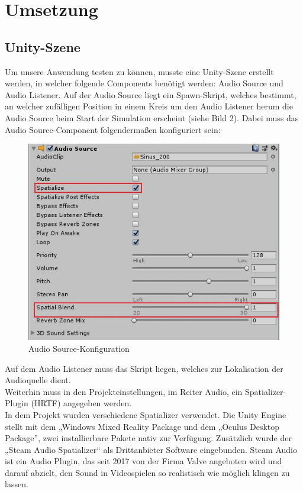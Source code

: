 \documentclass[12pt,a4paper]{article}
\begin{document}
\section{Umsetzung}
\subsection{Unity-Szene}
Um unsere Anwendung testen zu können, musste eine Unity-Szene erstellt werden, in welcher folgende Components benötigt werden: Audio Source und Audio Listener. Auf der Audio Source liegt ein Spawn-Skript, welches bestimmt, an welcher zufälligen Position in einem Kreis um den Audio Listener herum die Audio Source beim Start der Simulation erscheint (siehe Bild 2). Dabei muss das Audio Source-Component folgendermaßen konfiguriert sein:

\begin{figure}[h!]
\centering
\includegraphics[scale=0.6]{setup2}
\caption{Audio Source-Konfiguration}
\end{figure}

Auf dem Audio Listener muss das Skript liegen, welches zur Lokalisation der Audioquelle dient.\\
Weiterhin muss in den Projekteinstellungen, im Reiter Audio, ein Spatializer-Plugin (HRTF) angegeben werden.\\
In dem Projekt wurden verschiedene Spatializer verwendet. Die Unity Engine stellt mit dem „Windows Mixed Reality Package und dem „Oculus Desktop Package”, zwei installierbare Pakete nativ zur Verfügung. Zusätzlich wurde der „Steam Audio Spatializer“ als Drittanbieter Software eingebunden. Steam Audio ist ein Audio Plugin, das seit 2017 von der Firma Valve angeboten wird und darauf abzielt, den Sound in Videospielen so realistisch wie möglich klingen zu lassen.\\
\end{document}
